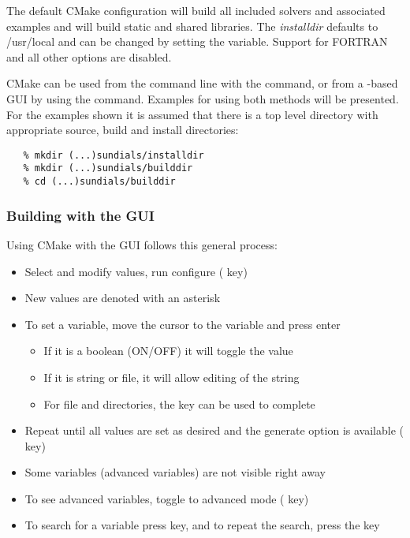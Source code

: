 The default CMake configuration will build all included solvers and associated examples
and will build static and shared libraries. The {\em installdir} defaults to /usr/local and can be changed
by setting the  variable.
Support for FORTRAN and all other options are disabled.

CMake can be used from the command line with the  command, or from a -based GUI
by using the  command. Examples for using both methods will be presented.
For the examples shown it is assumed that there is a top level {\sundials} directory
with appropriate source, build and install directories:

\begin{verbatim}
   % mkdir (...)sundials/installdir
   % mkdir (...)sundials/builddir
   % cd (...)sundials/builddir
\end{verbatim}

\subsubsection*{Building with the GUI}

Using CMake with the GUI follows this general process:  
\begin{itemize}
\item Select and modify values, run configure ( key)
\item New values are denoted with an asterisk
\item To set a variable, move the cursor to the variable and press enter
  \begin{itemize}
  \item If it is a boolean (ON/OFF) it will toggle the value
  \item If it is string or file, it will allow editing of the string
  \item For file and directories, the  key can be used to complete 
  \end{itemize}
\item Repeat until all values are set as desired and the generate option is available ( key)
\item Some variables (advanced variables) are not visible right away
\item To see advanced variables, toggle to advanced mode ( key)
\item To search for a variable press \id{/} key, and to repeat the search, press the
 key
\end{itemize}

